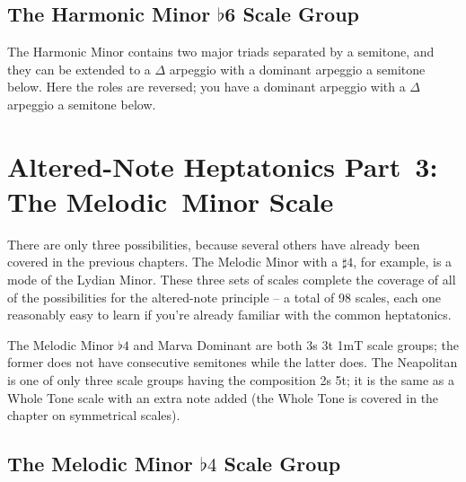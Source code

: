 \documentclass[english]{./gbook}
\newcommand{\titlebreak}{}
\begin{document}
\begin{large}


\section{The Harmonic Minor $\flat$6 Scale Group}

The Harmonic Minor contains two major triads separated by a semitone, and they can be extended to a $\Delta$ arpeggio with a dominant arpeggio a semitone below. Here the roles are reversed; you have a dominant arpeggio with a $\Delta$ arpeggio a semitone below. 





\chapter{\mbox{Altered-Note} \titlebreak \mbox{Heptatonics} \mbox{Part 3:} \\ The Melodic\ Minor Scale}

There are only three possibilities, because several others have already been covered in the previous chapters. The Melodic Minor with a $\sharp 4$, for example, is a mode of the Lydian Minor. These three sets of scales complete the coverage of all of the possibilities for the altered-note principle -- a total of 98 scales, each one reasonably easy to learn if you're already familiar with the common heptatonics.

The Melodic Minor $\flat 4$ and Marva Dominant are both 3s 3t 1mT scale groups; the former does not have consecutive semitones while the latter does. The Neapolitan is one of only three scale groups having the composition 2s 5t; it is the same as a Whole Tone scale with an extra note added (the Whole Tone is covered in the chapter on symmetrical scales). 

\section{The Melodic Minor $\flat 4$ Scale Group}


\end{large}
\end{document}
